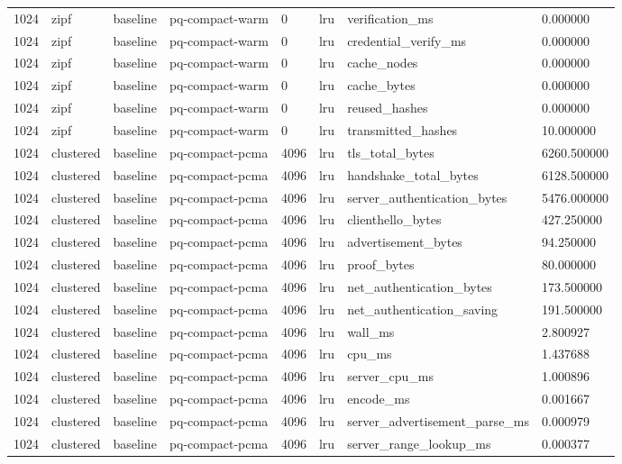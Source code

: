 \begin{tabular}{llllllll}
1024 & zipf & baseline & pq-compact-warm & 0 & lru & verification\_ms & 0.000000 \\
1024 & zipf & baseline & pq-compact-warm & 0 & lru & credential\_verify\_ms & 0.000000 \\
1024 & zipf & baseline & pq-compact-warm & 0 & lru & cache\_nodes & 0.000000 \\
1024 & zipf & baseline & pq-compact-warm & 0 & lru & cache\_bytes & 0.000000 \\
1024 & zipf & baseline & pq-compact-warm & 0 & lru & reused\_hashes & 0.000000 \\
1024 & zipf & baseline & pq-compact-warm & 0 & lru & transmitted\_hashes & 10.000000 \\
1024 & clustered & baseline & pq-compact-pcma & 4096 & lru & tls\_total\_bytes & 6260.500000 \\
1024 & clustered & baseline & pq-compact-pcma & 4096 & lru & handshake\_total\_bytes & 6128.500000 \\
1024 & clustered & baseline & pq-compact-pcma & 4096 & lru & server\_authentication\_bytes & 5476.000000 \\
1024 & clustered & baseline & pq-compact-pcma & 4096 & lru & clienthello\_bytes & 427.250000 \\
1024 & clustered & baseline & pq-compact-pcma & 4096 & lru & advertisement\_bytes & 94.250000 \\
1024 & clustered & baseline & pq-compact-pcma & 4096 & lru & proof\_bytes & 80.000000 \\
1024 & clustered & baseline & pq-compact-pcma & 4096 & lru & net\_authentication\_bytes & 173.500000 \\
1024 & clustered & baseline & pq-compact-pcma & 4096 & lru & net\_authentication\_saving & 191.500000 \\
1024 & clustered & baseline & pq-compact-pcma & 4096 & lru & wall\_ms & 2.800927 \\
1024 & clustered & baseline & pq-compact-pcma & 4096 & lru & cpu\_ms & 1.437688 \\
1024 & clustered & baseline & pq-compact-pcma & 4096 & lru & server\_cpu\_ms & 1.000896 \\
1024 & clustered & baseline & pq-compact-pcma & 4096 & lru & encode\_ms & 0.001667 \\
1024 & clustered & baseline & pq-compact-pcma & 4096 & lru & server\_advertisement\_parse\_ms & 0.000979 \\
1024 & clustered & baseline & pq-compact-pcma & 4096 & lru & server\_range\_lookup\_ms & 0.000377 \\

\end{tabular}

